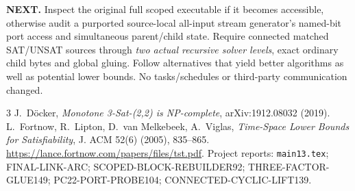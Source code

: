 \documentclass[11pt]{article}
\begin{document}
\noindent\textbf{NEXT.} Inspect the original full scoped executable if it becomes accessible, otherwise audit a purported source-local all-input stream generator's named-bit port access and simultaneous parent/child state. Require connected matched SAT/UNSAT sources through \emph{two actual recursive solver levels}, exact ordinary child bytes and global gluing. Follow alternatives that yield better algorithms as well as potential lower bounds. No tasks/schedules or third-party communication changed.

\begin{thebibliography}{3}
 J.~D\"ocker, \emph{Monotone 3-Sat-(2,2) is NP-complete}, arXiv:1912.08032 (2019).
 L.~Fortnow, R.~Lipton, D.~van Melkebeek, A.~Viglas, \emph{Time-Space Lower Bounds for Satisfiability}, J. ACM 52(6) (2005), 835--865. \url{https://lance.fortnow.com/papers/files/tst.pdf}.
 Project reports: \texttt{main13.tex}; FINAL-LINK-ARC; SCOPED-BLOCK-REBUILDER92; THREE-FACTOR-GLUE149; PC22-PORT-PROBE104; CONNECTED-CYCLIC-LIFT139.
\end{thebibliography}
\end{document}
